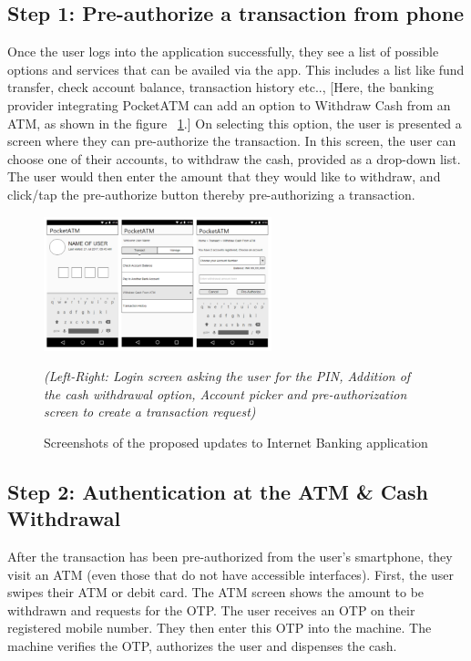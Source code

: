 \subsection*{Step 1: Pre-authorize a transaction from phone}
\label{ssec:step1}

Once the user logs into the application successfully, they see a list of possible options and services that can be availed via the app. This includes a list like fund transfer, check account balance, transaction history etc.., [Here, the banking provider integrating PocketATM can add an option to Withdraw Cash from an ATM, as shown in the figure ~\ref{fig:UIProposals}.] On selecting this option, the user is presented a screen where they can pre-authorize the transaction. In this screen, the user can choose one of their accounts, to withdraw the cash, provided as a drop-down list. The user would then enter the amount that they would like to withdraw, and click/tap the pre-authorize button thereby pre-authorizing a transaction.

\begin{figure}
    \includegraphics[width=250px]{pocketatmaccountpicker}
    \caption{Screenshots of the proposed updates to Internet Banking application}
    \label{fig:UIProposals}
    {\textit{(Left-Right: Login screen asking the user for the PIN, Addition of the cash withdrawal option, Account picker and pre-authorization screen to create a transaction request)}}
\end{figure}

\subsection*{Step 2: Authentication at the ATM \& Cash Withdrawal}
\label{ssec:step2}

After the transaction has been pre-authorized from the user's smartphone, they visit an ATM (even those that do not have accessible interfaces). First, the user swipes their ATM or debit card. The ATM screen shows the amount to be withdrawn and requests for the OTP. The user receives an OTP on their registered mobile number. They then enter this OTP into the machine. The machine verifies the OTP, authorizes the user and dispenses the cash.  


